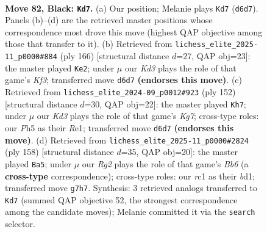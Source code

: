 \documentclass[11pt]{article}
\begin{document}
\clearpage

\begin{figure}[p]\centering
\begin{subfigure}{0.46\textwidth}\centering
\resizebox{\linewidth}{!}{%
\newchessgame
\chessboard[
  setfen={8/6r1/p2k4/Ppp2p1p/2p2P1P/4PKP1/1P6/2R5 b - - 10 82},
  showmover=false,
  pgfstyle=straightmove, color=movearrow, markmove={d6-d7}
]}
\caption{}
\end{subfigure}\hfill
\begin{subfigure}{0.46\textwidth}\centering
\resizebox{\linewidth}{!}{%
\newchessgame
\chessboard[
  setfen={3r4/1p6/p1p2kp1/P6p/1P3P1P/4PK2/2R5/8 w - - 3 84},
  showmover=false,
  pgfstyle=straightmove, color=movearrow, markmove={f3-e2}
]}
\caption{}
\end{subfigure}
\\[4pt]
\begin{subfigure}{0.46\textwidth}\centering
\resizebox{\linewidth}{!}{%
\newchessgame
\chessboard[
  setfen={8/2pk2K1/1p1p2P1/p2P4/P1P5/1P3r2/8/4R3 w - - 14 77},
  showmover=false,
  pgfstyle=straightmove, color=movearrow, markmove={g7-h7}
]}
\caption{}
\end{subfigure}\hfill
\begin{subfigure}{0.46\textwidth}\centering
\resizebox{\linewidth}{!}{%
\newchessgame
\chessboard[
  setfen={8/5kp1/pB3p1p/1p1p3P/3P2P1/P1P2PK1/8/3b4 w - - 39 80},
  showmover=false,
  pgfstyle=straightmove, color=movearrow, markmove={b6-a5}
]}
\caption{}
\end{subfigure}
\caption{\textbf{Move 82, Black: \texttt{Kd7}.} (a) Our position; Melanie plays \texttt{Kd7} (\texttt{d6d7}). Panels (b)--(d) are the retrieved master positions whose correspondence most drove this move (highest QAP objective among those that transfer to it). (b) Retrieved from \texttt{lichess\_elite\_2025-11\_p0000\#884} (ply 166) [structural distance $d$=27, QAP obj=23]: the master played \texttt{Ke2}; under $\mu$ our \emph{Kd3} plays the role of that game's \emph{Kf3}; transferred move \texttt{d6d7} \textbf{(endorses this move)}. (c) Retrieved from \texttt{lichess\_elite\_2024-09\_p0012\#923} (ply 152) [structural distance $d$=30, QAP obj=22]: the master played \texttt{Kh7}; under $\mu$ our \emph{Kd3} plays the role of that game's \emph{Kg7}; cross-type roles: our \emph{P}h5 as their \emph{R}e1; transferred move \texttt{d6d7} \textbf{(endorses this move)}. (d) Retrieved from \texttt{lichess\_elite\_2025-11\_p0000\#2824} (ply 158) [structural distance $d$=35, QAP obj=20]: the master played \texttt{Ba5}; under $\mu$ our \emph{Rg2} plays the role of that game's \emph{Bb6} (a \textbf{cross-type} correspondence); cross-type roles: our \emph{r}c1 as their \emph{b}d1; transferred move \texttt{g7h7}. Synthesis: 3 retrieved analogs transferred to \texttt{Kd7} (summed QAP objective 52, the strongest correspondence among the candidate moves); Melanie committed it via the \texttt{search} selector.}
\label{fig:thought-m163}
\end{figure}
\end{document}
